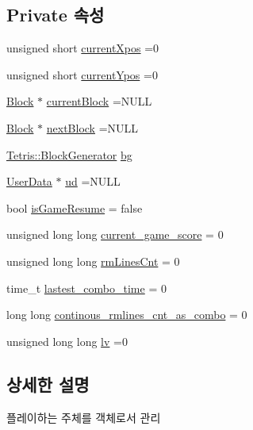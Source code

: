 \subsection*{Private 속성}
\begin{DoxyCompactItemize}
\item 
unsigned short \hyperlink{class_tetris_1_1_users_1_1_game_user_a3edcace8f88494f9cee4ba99ba9b6c87}{current\+Xpos} =0
\item 
unsigned short \hyperlink{class_tetris_1_1_users_1_1_game_user_ac1d5e4a4f73eb8502faae95d7958d83e}{current\+Ypos} =0
\item 
\hyperlink{class_tetris_1_1_block}{Block} $\ast$ \hyperlink{class_tetris_1_1_users_1_1_game_user_a65c4841efffdf4b6fbe8ac30fb2fb5d1}{current\+Block} =N\+U\+LL
\item 
\hyperlink{class_tetris_1_1_block}{Block} $\ast$ \hyperlink{class_tetris_1_1_users_1_1_game_user_a49be97be588cd4b6438f06ec693787d5}{next\+Block} =N\+U\+LL
\item 
\hyperlink{class_tetris_1_1_block_generator}{Tetris\+::\+Block\+Generator} \hyperlink{class_tetris_1_1_users_1_1_game_user_ad57a39d1716322764d92ff76f08ebcd5}{bg}
\item 
\hyperlink{class_tetris_1_1_users_1_1_user_data}{User\+Data} $\ast$ \hyperlink{class_tetris_1_1_users_1_1_game_user_ac1f44d636258caa01f3041408d235289}{ud} =N\+U\+LL
\item 
bool \hyperlink{class_tetris_1_1_users_1_1_game_user_a7f1389568b9af1e543a54bedd2e39ffc}{is\+Game\+Resume} = false
\item 
unsigned long long \hyperlink{class_tetris_1_1_users_1_1_game_user_aae9d0156964b3872f7cd3917ae662ec2}{current\+\_\+game\+\_\+score} = 0
\item 
unsigned long long \hyperlink{class_tetris_1_1_users_1_1_game_user_ac5857cc9f0318a8dfbcf551424ccf8f3}{rm\+Lines\+Cnt} = 0
\item 
time\+\_\+t \hyperlink{class_tetris_1_1_users_1_1_game_user_a1268a4608b581740139e81b2324c9166}{lastest\+\_\+combo\+\_\+time} = 0
\item 
long long \hyperlink{class_tetris_1_1_users_1_1_game_user_a49692727d4018181845500b0ee765296}{continous\+\_\+rmlines\+\_\+cnt\+\_\+as\+\_\+combo} = 0
\item 
unsigned long long \hyperlink{class_tetris_1_1_users_1_1_game_user_a11a2856fee30a69a19550b42c041a312}{lv} =0
\end{DoxyCompactItemize}


\subsection{상세한 설명}
플레이하는 주체를 객체로서 관리 

